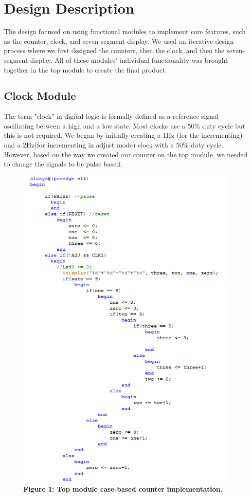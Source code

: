 \documentclass[journal]{IEEEtran}
\begin{document}

\section{Design Description}
The design focused on using functional modules to implement core features, such as the counter, clock, and seven segment display. We used an iterative design process where we first designed the counters, then the clock, and then the seven-segment display. All of these modules' individual functionality was brought together in the top module to create the final product.
\subsection{Clock Module}
The term "clock" in digital logic is formally defined as a reference signal oscillating between a high and a low state. Most clocks use a 50\% duty cycle but this is not required. We began by initially creating a 1Hz (for the incrementing) and a 2Hz(for incrementing in adjust mode) clock with a 50\% duty cycle. However, based on the way we created our counter on the top module, we needed to change the signals to be pulse based. 
\begin{figure}[H]
	\centering\includegraphics[scale=0.6]{topmod1}
	\caption{\textbf{Figure 1: Top module case-based counter implementation.}}
\end{figure}
\end{document}
